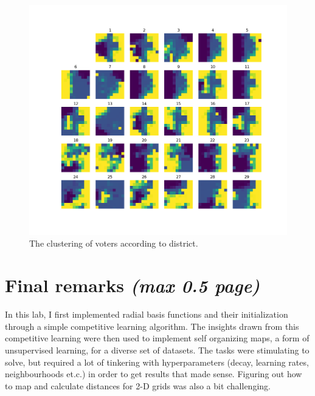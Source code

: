 \documentclass[a4paper]{article}
\begin{document}
\begin{figure}[ht]
  \includegraphics[width=\linewidth]{figures/districts.png}
  \caption{The clustering of voters according to district.}
  \label{fig:districts}
\end{figure}


\section{Final remarks \normalsize{\textit{(max 0.5 page)}}}

In this lab, I first implemented radial basis functions and their initialization through a simple competitive learning algorithm. The insights drawn from this competitive learning were then used to implement self organizing maps, a form of unsupervised learning, for a diverse set of datasets. The tasks were stimulating to solve, but required a lot of tinkering with hyperparameters (decay, learning rates, neighbourhoods et.c.) in order to get results that made sense. Figuring out how to map and calculate distances for 2-D grids was also a bit challenging.
\end{document}
